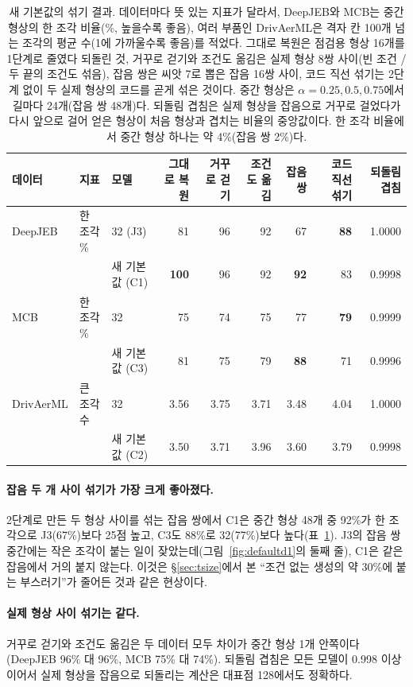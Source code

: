 \documentclass[11pt]{article}
\begin{document}
\begin{table}[htbp]
\centering\footnotesize\setlength{\tabcolsep}{3.6pt}
\begin{tabular}{l l l r r r r r r}
\toprule
데이터 & 지표 & 모델 & 그대로 복원 & 거꾸로 걷기 & 조건도 옮김 & 잡음 쌍 & 코드 직선 섞기 & 되돌림 겹침 \\
\midrule
DeepJEB & 한 조각 \% & 32 (J3) & 81 & 96 & 92 & 67 & \textbf{88} & 1.0000 \\
 & & 새 기본값 (C1) & \textbf{100} & 96 & 92 & \textbf{92} & 83 & 0.9998 \\
\midrule
MCB & 한 조각 \% & 32 & 75 & 74 & 75 & 77 & \textbf{79} & 0.9999 \\
 & & 새 기본값 (C3) & 81 & 75 & 79 & \textbf{88} & 71 & 0.9996 \\
\midrule
DrivAerML & 큰 조각 수 & 32 & 3.56 & 3.75 & 3.71 & 3.48 & 4.04 & 1.0000 \\
 & & 새 기본값 (C2) & 3.50 & 3.71 & 3.96 & 3.60 & 3.79 & 0.9998 \\
\bottomrule
\end{tabular}
\caption{새 기본값의 섞기 결과. 데이터마다 뜻 있는 지표가 달라서, DeepJEB와 MCB는 중간 형상의 한 조각 비율(\%, 높을수록 좋음), 여러 부품인 DrivAerML은
격자 칸 100개 넘는 조각의 평균 수(1에 가까울수록 좋음)를 적었다. 그대로 복원은 점검용 형상 16개를 1단계로 줄였다 되돌린 것, 거꾸로 걷기와 조건도 옮김은 실제 형상 8쌍 사이(빈 조건 / 두 끝의 조건도 섞음),
잡음 쌍은 씨앗 7로 뽑은 잡음 16쌍 사이, 코드 직선 섞기는 2단계 없이 두 실제 형상의 코드를 곧게 섞은 것이다. 중간 형상은 $\alpha=0.25, 0.5, 0.75$에서 길마다 24개(잡음 쌍 48개)다.
되돌림 겹침은 실제 형상을 잡음으로 거꾸로 걸었다가 다시 앞으로 걸어 얻은 형상이 처음 형상과 겹치는 비율의 중앙값이다. 한 조각 비율에서 중간 형상 하나는 약 4\%(잡음 쌍 2\%)다.}
\label{tab:defaultinterp}
\end{table}

\paragraph{잡음 두 개 사이 섞기가 가장 크게 좋아졌다.} 2단계로 만든 두 형상 사이를 섞는 잡음 쌍에서 C1은 중간 형상 48개 중 92\%가 한 조각으로 J3(67\%)보다 25점 높고, C3도 88\%로 32(77\%)보다 높다(표~\ref{tab:defaultinterp}).
J3의 잡음 쌍 중간에는 작은 조각이 붙는 일이 잦았는데(그림~\ref{fig:defaultd1}의 둘째 줄), C1은 같은 잡음에서 거의 붙지 않는다. 이것은 \S\ref{sec:tsize}에서 본 ``조건 없는 생성의 약 30\%에 붙는 부스러기''가
줄어든 것과 같은 현상이다.

\paragraph{실제 형상 사이 섞기는 같다.} 거꾸로 걷기와 조건도 옮김은 두 데이터 모두 차이가 중간 형상 1개 안쪽이다(DeepJEB 96\% 대 96\%, MCB 75\% 대 74\%). 되돌림 겹침은 모든 모델이 0.998 이상이어서
실제 형상을 잡음으로 되돌리는 계산은 대표점 128에서도 정확하다.
\end{document}
